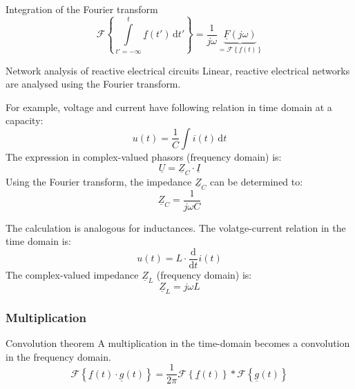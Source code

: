 \begin{refsection}
\begin{definition}{Integration of the Fourier transform}
	\begin{equation}
		\mathcal{F}\left\{\int\limits_{t'= -\infty}^{t} \underline{f}(t') \, \mathrm{d} t' \right\} = \frac{1}{j \omega} \underbrace{\underline{F} \left(j \omega\right)}_{= \mathcal{F}\left\{\underline{f}(t)\right\}}
		\label{eq:ch02:op_int}
	\end{equation}
\end{definition}

\begin{excursus}{Network analysis of reactive electrical circuits}
	Linear, reactive electrical networks are analysed using the Fourier transform.
	
	For example, voltage and current have following relation in time domain at a capacity:
	\begin{equation}
		u(t) = \frac{1}{C} \int i(t) \, \mathrm{d} t
	\end{equation}
	The expression in complex-valued phasors (frequency domain) is:
	\begin{equation}
		\underline{U} = \underline{Z}_C \cdot \underline{I}
	\end{equation}
	Using the Fourier transform, the impedance $\underline{Z}_C$ can be determined to:
	\begin{equation}
		\underline{Z}_C = \frac{1}{j \omega C}
	\end{equation}
	
	The calculation is analogous for inductances. The volatge-current relation in the time domain is:
	\begin{equation}
		u(t) = L \cdot \frac{\mathrm{d}}{\mathrm{d} t} i(t)
	\end{equation}
	The complex-valued impedance $\underline{Z}_L$ (frequency domain) is:
	\begin{equation}
		\underline{Z}_L = j \omega L
	\end{equation}
\end{excursus}

\subsubsection{Multiplication}

\begin{definition}{Convolution theorem}
	A multiplication in the time-domain becomes a convolution in the frequency domain.
	\begin{equation}
		\mathcal{F}\left\{ \underline{f}(t) \cdot \underline{g}(t) \right\} = \frac{1}{2 \pi} \mathcal{F}\left\{\underline{f}(t)\right\} * \mathcal{F}\left\{\underline{g}(t)\right\}
		\label{eq:ch02:op_mult}
	\end{equation}
\end{definition}


\end{refsection}
